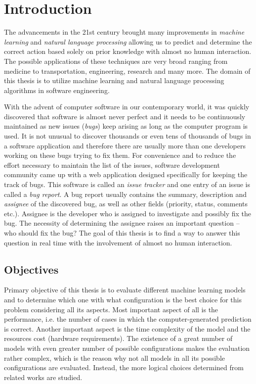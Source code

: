 \chapter{Introduction}

The advancements in the 21st century brought many improvements in \textit{machine learning} and \textit{natural language processing} allowing us to predict and determine the correct action based solely on prior knowledge with almost no human interaction. The possible applications of these techniques are very broad ranging from medicine to transportation, engineering, research and many more. The domain of this thesis is to utilize machine learning and natural language processing algorithms in software engineering.

With the advent of computer software in our contemporary world, it was quickly discovered that software is almost never perfect and it needs to be continuously maintained as new issues (\textit{bugs}) keep arising as long as the computer program is used. It is not unusual to discover thousands or even tens of thousands of bugs in a software application and therefore there are usually more than one developers working on these bugs trying to fix them. For convenience and to reduce the effort necessary to maintain the list of the issues, software development community came up with a web application designed specifically for keeping the track of bugs. This software is called an \textit{issue tracker} and one entry of an issue is called a \textit{bug report}. A bug report usually contains the summary, description and \textit{assignee} of the discovered bug, as well as other fields (priority, status, comments etc.). Assignee is the developer who is assigned to investigate and possibly fix the bug. The necessity of determining the assignee raises an important question -- who should fix the bug? The goal of this thesis is to find a way to answer this question in real time with the involvement of almost no human interaction.

\section{Objectives}

Primary objective of this thesis is to evaluate different machine learning models and to determine which one with what configuration is the best choice for this problem considering all its aspects. Most important aspect of all is the performance, i.e. the number of cases in which the computer-generated prediction is correct. Another important aspect is the time complexity of the model and the resources cost (hardware requirements). The existence of a great number of models with even greater number of possible configurations makes the evaluation rather complex, which is the reason why not all models in all its possible configurations are evaluated. Instead, the more logical choices determined from related works are studied.

